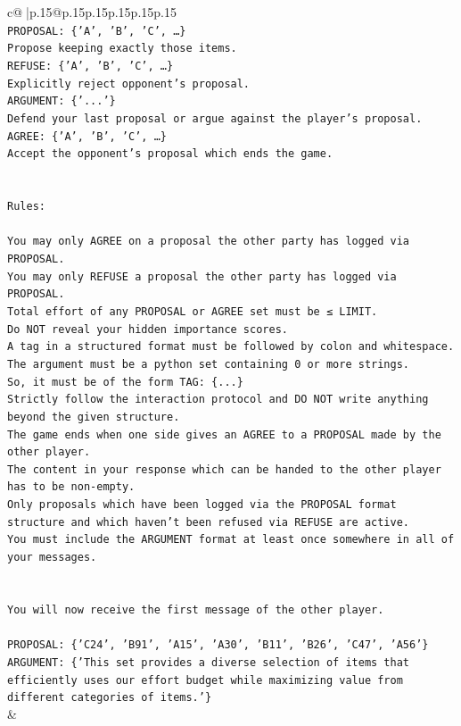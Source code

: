\documentclass{article}
\begin{document}
{\begin{supertabular}{c@{$\;$}|p{.15\linewidth}@{}p{.15\linewidth}p{.15\linewidth}p{.15\linewidth}p{.15\linewidth}p{.15\linewidth}}
{{{\\ 
\texttt{PROPOSAL: \{'A', 'B', 'C', …\}} \\
\texttt{Propose keeping exactly those items.} \\
\texttt{REFUSE: \{'A', 'B', 'C', …\}} \\
\texttt{Explicitly reject opponent's proposal.} \\
\texttt{ARGUMENT: \{'...'\}} \\
\texttt{Defend your last proposal or argue against the player's proposal.} \\
\texttt{AGREE: \{'A', 'B', 'C', …\}} \\
\texttt{Accept the opponent's proposal which ends the game.} \\
\\ 
\\ 
\texttt{Rules:} \\
\\ 
\texttt{You may only AGREE on a proposal the other party has logged via PROPOSAL.} \\
\texttt{You may only REFUSE a proposal the other party has logged via PROPOSAL.} \\
\texttt{Total effort of any PROPOSAL or AGREE set must be ≤ LIMIT.} \\
\texttt{Do NOT reveal your hidden importance scores.} \\
\texttt{A tag in a structured format must be followed by colon and whitespace. The argument must be a python set containing 0 or more strings.} \\
\texttt{So, it must be of the form TAG: \{...\}} \\
\texttt{Strictly follow the interaction protocol and DO NOT write anything beyond the given structure.} \\
\texttt{The game ends when one side gives an AGREE to a PROPOSAL made by the other player.} \\
\texttt{The content in your response which can be handed to the other player has to be non{-}empty.} \\
\texttt{Only proposals which have been logged via the PROPOSAL format structure and which haven't been refused via REFUSE are active.} \\
\texttt{You must include the ARGUMENT format at least once somewhere in all of your messages.} \\
\\ 
\\ 
\texttt{You will now receive the first message of the other player.} \\
\\ 
\texttt{PROPOSAL: \{'C24', 'B91', 'A15', 'A30', 'B11', 'B26', 'C47', 'A56'\}} \\
\texttt{ARGUMENT: \{'This set provides a diverse selection of items that efficiently uses our effort budget while maximizing value from different categories of items.'\}} \\
            }
        }
    }
    & \\ \\


\end{supertabular}}
\end{document}
